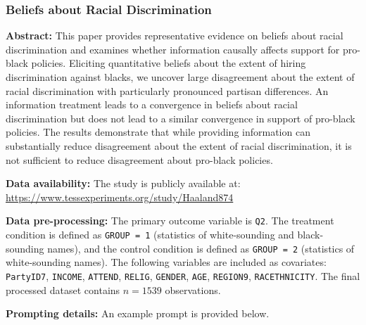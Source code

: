 \subsubsection{Beliefs about Racial Discrimination~\citep{haaland2023beliefs}} 

\textbf{Abstract:} This paper provides representative evidence on beliefs about racial discrimination and examines whether information causally affects support for pro-black policies. Eliciting quantitative beliefs about the extent of hiring discrimination against blacks, we uncover large disagreement about the extent of racial discrimination with particularly pronounced partisan differences. An information treatment leads to a convergence in beliefs about racial discrimination but does not lead to a similar convergence in support of pro-black policies. The results demonstrate that while providing information can substantially reduce disagreement about the extent of racial discrimination, it is not sufficient to reduce disagreement about pro-black policies.

\textbf{Data availability:}  The study is publicly available at: \url{https://www.tessexperiments.org/study/Haaland874}

\textbf{Data pre-processing:} The primary outcome variable is \texttt{Q2}. The treatment condition is defined as \texttt{GROUP = 1} (statistics of white-sounding and black-sounding names), and the control condition is defined as \texttt{GROUP = 2} (statistics of white-sounding names). The following variables are included as covariates: \texttt{PartyID7}, \texttt{INCOME}, \texttt{ATTEND}, \texttt{RELIG}, \texttt{GENDER}, \texttt{AGE}, \texttt{REGION9}, \texttt{RACETHNICITY}. The final processed dataset contains $n=1539$ observations.



\textbf{Prompting details:} 
An example prompt is provided below.

